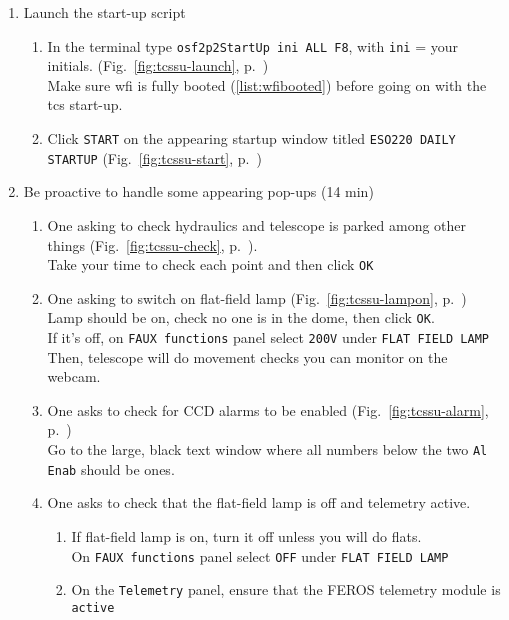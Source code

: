\documentclass[11pt,fleqn]{book}
\def\figref#1{Fig.~\ref{fig:#1}, p.~\pageref{fig:#1}}
\begin{document}
\begin{enumerate}
\begin{enumerate}
          \item Launch the start-up script
          \begin{enumerate}
             \item In the terminal type \texttt{osf2p2StartUp ini ALL F8}, with \texttt{ini} = your initials.\label{list:tcsboot} (\figref{tcssu-launch})\\
                   Make sure \gls{wfi} is fully booted (\ref{list:wfibooted}) before going on with the \gls{tcs} start-up.
              \item Click \texttt{START} on the appearing startup window titled \texttt{ESO220 DAILY STARTUP} (\figref{tcssu-start})
          \end{enumerate}
          \item Be proactive to handle some appearing pop-ups (14 min) 
          \begin{enumerate}
             \item One asking to check hydraulics and telescope is parked among other things (\figref{tcssu-check}).\\
                   Take your time to check each point and then click \texttt{OK}          
             \item One asking to switch on flat-field lamp\label{list:tcsonline} (\figref{tcssu-lampon})\\
                   Lamp should be on, check no one is in the dome, then click \texttt{OK}.\\
                   If it's off, on \texttt{FAUX functions} panel select \texttt{200V} under \texttt{FLAT FIELD LAMP}\\
                   Then, telescope will do movement checks you can monitor on the webcam.
             \item One asks to check for CCD alarms to be enabled (\figref{tcssu-alarm})\\
                   Go to the large, black text window where all numbers below the two \texttt{Al Enab} should be ones.
             \item One asks to check that the flat-field lamp is off and telemetry active.
                \begin{enumerate}
                 \item If flat-field lamp is on, turn it off unless you will do flats.\\
                   On \texttt{FAUX functions} panel select \texttt{OFF} under \texttt{FLAT FIELD LAMP}          
                 \item On the \texttt{Telemetry} panel, ensure that the FEROS telemetry module is \texttt{active}\\

\end{enumerate}
\end{enumerate}
\end{enumerate}
\end{enumerate}
\end{document}

